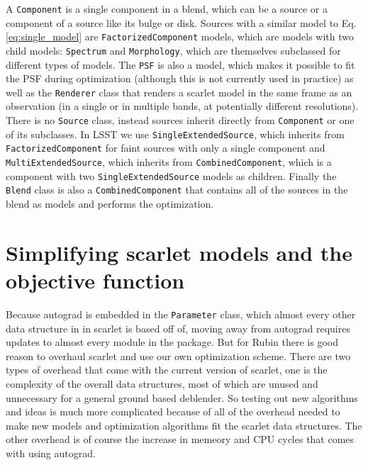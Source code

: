\documentclass[DM,authoryear,toc]{lsstdoc}
\begin{document}
A \texttt{Component} is a single component in a blend, which can be a source or a component of a source like its bulge or disk. Sources with a similar model to Eq. \ref{eq:single_model} are \texttt{FactorizedComponent} models, which are models with two child models: \texttt{Spectrum} and \texttt{Morphology}, which are themselves subclassed for different types of models. The \texttt{PSF} is also a model, which makes it possible to fit the PSF during optimization (although this is not currently used in practice) as well as the \texttt{Renderer} class that renders a scarlet model in the same frame as an observation (in a single or in multiple bands, at potentially different resolutions). There is no \texttt{Source} class, instead sources inherit directly from \texttt{Component} or one of its subclasses. In LSST we use \texttt{SingleExtendedSource}, which inherits from \texttt{FactorizedComponent} for faint sources with only a single component and \texttt{MultiExtendedSource}, which inherits from \texttt{CombinedComponent}, which is a component with two \texttt{SingleExtendedSource} models as children. Finally the \texttt{Blend} class is also a \texttt{CombinedComponent} that contains all of the sources in the blend as models and performs the optimization.

\section{Simplifying scarlet models and the objective function}

Because autograd is embedded in the \texttt{Parameter} class, which almost every other data structure in in scarlet is based off of, moving away from autograd requires updates to almost every module in the package. But for Rubin there is good reason to overhaul scarlet and use our own optimization scheme. There are two types of overhead that come with the current version of scarlet, one is the complexity of the overall data structures, most of which are unused and unnecessary for a general ground based deblender. So testing out new algorithms and ideas is much more complicated because of all of the overhead needed to make new models and optimization algorithms fit the scarlet data structures. The other overhead is of course the increase in memeory and CPU cycles that comes with using autograd.
\end{document}
